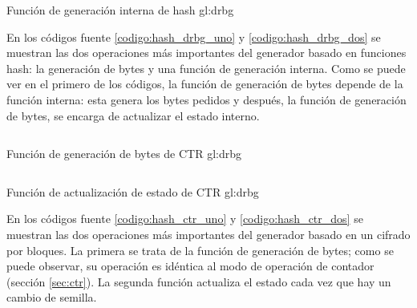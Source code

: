 \begin{listing}
  \inputminted[firstline=166, lastline=186]
    {c++}{../implementaciones/drbg/hash_drbg.cpp}
  \caption{Función de generación interna de hash \gls{gl:drbg}}
  \label{codigo:hash_drbg_dos}
\end{listing}

En los códigos fuente \ref{codigo:hash_drbg_uno} y \ref{codigo:hash_drbg_dos}
se muestran las dos operaciones más importantes del generador basado en
funciones hash: la generación de bytes y una función de generación interna.
Como se puede ver en el primero de los códigos, la función de generación de
bytes depende de la función interna: esta genera los bytes pedidos y después,
la función de generación de bytes, se encarga de actualizar el estado interno.

\begin{listing}
  \inputminted[firstline=82, lastline=101]
    {c++}{../implementaciones/drbg/ctr_drbg.cpp}
  \caption{Función de generación de bytes de CTR \gls{gl:drbg}}
  \label{codigo:hash_ctr_uno}
\end{listing}

\begin{listing}
  \inputminted[firstline=103, lastline=123]
    {c++}{../implementaciones/drbg/ctr_drbg.cpp}
  \caption{Función de actualización de estado de CTR \gls{gl:drbg}}
  \label{codigo:hash_ctr_dos}
\end{listing}

En los códigos fuente \ref{codigo:hash_ctr_uno} y \ref{codigo:hash_ctr_dos}
se muestran las dos operaciones más importantes del generador basado en un
cifrado por bloques. La primera se trata de la función de generación de bytes;
como se puede observar, su operación es idéntica al modo de operación de
contador (sección \ref{sec:ctr}). La segunda función actualiza el estado
cada vez que hay un cambio de semilla.
